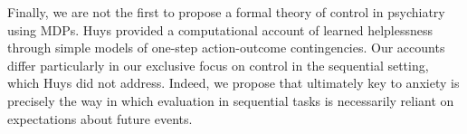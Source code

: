 \documentclass[11pt]{article} %
\begin{document}

Finally, we are not the first to propose a formal theory of control in psychiatry using MDPs. Huys\cite{HuysDayan2009} provided a computational account of learned helplessness through simple models of one-step action-outcome contingencies. Our accounts differ particularly in our exclusive focus on control in the sequential setting, which Huys did not address. Indeed, we propose that ultimately key to anxiety is precisely the way in which evaluation in sequential tasks is necessarily reliant on expectations about future events.


\small{}
\end{document}
